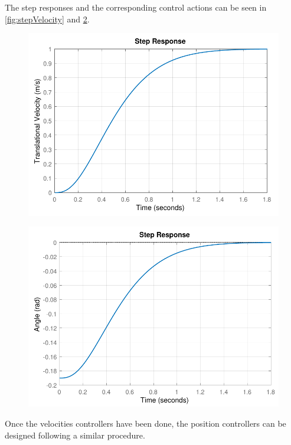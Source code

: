 The step responses and the corresponding control actions can be seen in \autoref{fig:stepVelocity} and \ref{fig:stepVelocityControlAction}.
%
\begin{minipage}{\linewidth}
    \begin{minipage}{0.5\linewidth}
        \begin{figure}[H]
            \includegraphics[scale=.55]{figures/stepVelocity}
            \centering
            \label{fig:stepVelocity}
        \end{figure}
    \end{minipage}
    \hspace{0.03\linewidth}
    \begin{minipage}{0.5\linewidth}
        \begin{figure}[H]
            \includegraphics[scale=.55]{figures/stepVelocityControlAction}
            \centering
            \label{fig:stepVelocityControlAction}
        \end{figure}
    \end{minipage}
\end{minipage}
%
Once the velocities controllers have been done, the position controllers can be designed following a similar procedure.

